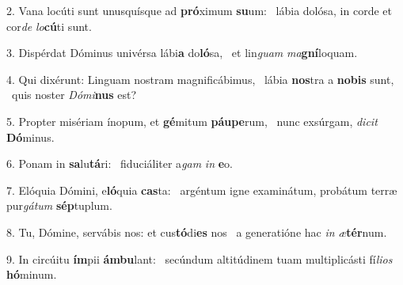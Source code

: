 2. Vana locúti sunt unusquísque ad \textbf{pró}ximum \textbf{su}um: \ast\  lábia dolósa, in corde et cor\textit{de} \textit{lo}\textbf{cú}ti sunt.\

3. Dispérdat Dóminus univérsa lábi\textbf{a} do\textbf{ló}sa, \ast\  et lin\textit{guam} \textit{ma}\textbf{gní}loquam.\

4. Qui dixérunt: Linguam nostram magnificábimus, \dag\  lábia \textbf{nos}tra a \textbf{no}\textbf{bis} sunt, \ast\  quis noster \textit{Dó}\textit{mi}\textbf{nus} est?\

5. Propter misériam ínopum, et \textbf{gé}mitum \textbf{páu}\textbf{pe}rum, \ast\  nunc exsúrgam, \textit{di}\textit{cit} \textbf{Dó}minus.\

6. Ponam in \textbf{sa}lu\textbf{tá}ri: \ast\  fiduciáliter a\textit{gam} \textit{in} \textbf{e}o.\

7. Elóquia Dómini, e\textbf{ló}quia \textbf{cas}ta: \ast\  argéntum igne examinátum, probátum terræ pur\textit{gá}\textit{tum} \textbf{sép}tuplum.\

8. Tu, Dómine, servábis nos: et cus\textbf{tó}di\textbf{es} nos \ast\  a generatióne hac \textit{in} \textit{æ}\textbf{tér}num.\

9. In circúitu \textbf{ím}pii \textbf{ám}\textbf{bu}lant: \ast\  secúndum altitúdinem tuam multiplicásti fí\textit{li}\textit{os} \textbf{hó}minum.\

